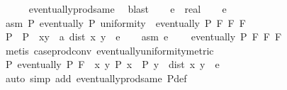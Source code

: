 \begin{isabellebody}
\ \ \ \ \isamarkupfalse%
\ eventually{\isacharunderscore}{\kern0pt}prod{\isacharunderscore}{\kern0pt}same\ \isamarkupfalse%
\ blast\isanewline
{}\isamarkupfalse%
\isanewline
\ \ \isamarkupfalse%
\ e\ {\isacharcolon}{\kern0pt}{\isacharcolon}{\kern0pt}\ real\isanewline
\ \ \isamarkupfalse%
\ {\isacartoucheopen}e\ {\isachargreater}{\kern0pt}\ {}{\isacartoucheclose}\isanewline
\ \ \isamarkupfalse%
\ asm{\isacharcolon}{\kern0pt}\ {\isacartoucheopen}{\isasymforall}P{\isachardot}{\kern0pt}\ eventually\ P\ uniformity\ {\isasymlongrightarrow}\ eventually\ P\ {\isacharparenleft}{\kern0pt}F\ {\isasymtimes}\isactrlsub F\ F{\isacharparenright}{\kern0pt}{\isacartoucheclose}\isanewline
\isanewline
\ \ \isamarkupfalse%
\ P\ \ {\isacartoucheopen}P\ {\isasymequiv}\ {\isasymlambda}{\isacharparenleft}{\kern0pt}x{\isacharcomma}{\kern0pt}y\ {\isacharcolon}{\kern0pt}{\isacharcolon}{\kern0pt}\ {\isacharprime}{\kern0pt}a{\isacharparenright}{\kern0pt}{\isachardot}{\kern0pt}\ dist\ x\ y\ {\isacharless}{\kern0pt}\ e{\isacartoucheclose}\isanewline
\ \ \isamarkupfalse%
\ asm\ {\isacartoucheopen}e\ {\isachargreater}{\kern0pt}\ {}{\isacartoucheclose}\ \isamarkupfalse%
\ {\isacartoucheopen}eventually\ P\ {\isacharparenleft}{\kern0pt}F\ {\isasymtimes}\isactrlsub F\ F{\isacharparenright}{\kern0pt}{\isacartoucheclose}\isanewline
\ \ \ \ \isamarkupfalse%
\ {\isacharparenleft}{\kern0pt}metis\ case{\isacharunderscore}{\kern0pt}prod{\isacharunderscore}{\kern0pt}conv\ eventually{\isacharunderscore}{\kern0pt}uniformity{\isacharunderscore}{\kern0pt}metric{\isacharparenright}{\kern0pt}\isanewline
\ \ \isamarkupfalse%
\isanewline
\ \ \isamarkupfalse%
\ {\isacartoucheopen}{\isasymexists}P{\isachardot}{\kern0pt}\ eventually\ P\ F\ {\isasymand}\ {\isacharparenleft}{\kern0pt}{\isasymforall}x\ y{\isachardot}{\kern0pt}\ P\ x\ {\isasymand}\ P\ y\ {\isasymlongrightarrow}\ dist\ x\ y\ {\isacharless}{\kern0pt}\ e{\isacharparenright}{\kern0pt}{\isacartoucheclose}\isanewline
\ \ \ \ \isamarkupfalse%
\ {\isacharparenleft}{\kern0pt}auto\ simp\ add{\isacharcolon}{\kern0pt}\ eventually{\isacharunderscore}{\kern0pt}prod{\isacharunderscore}{\kern0pt}same\ P{\isacharunderscore}{\kern0pt}def{\isacharparenright}{\kern0pt}\isanewline
{}\isamarkupfalse%
%
\endisatagproof
{\isafoldproof}%
%
\isadelimproof
\isanewline
%
\endisadelimproof
\isanewline
\isanewline

\end{isabellebody}
